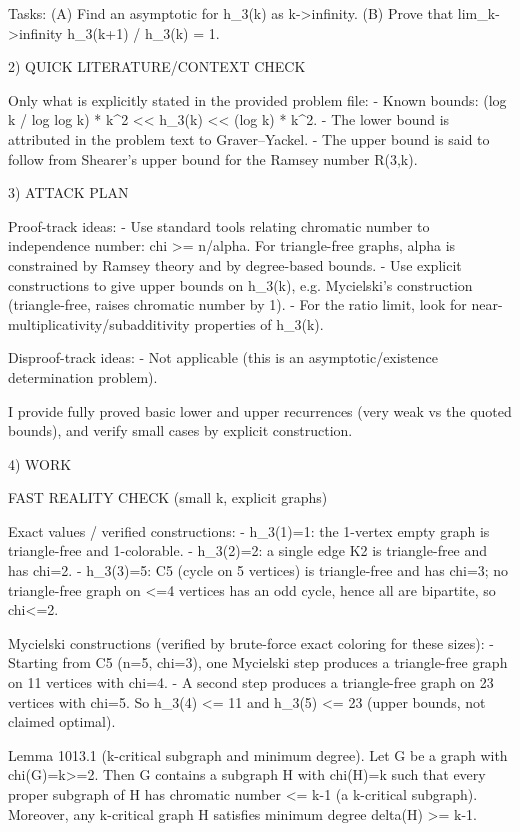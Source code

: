 Tasks:
(A) Find an asymptotic for h_3(k) as k->infinity.
(B) Prove that
  lim_{k->infinity} h_3(k+1) / h_3(k) = 1.

2) QUICK LITERATURE/CONTEXT CHECK

Only what is explicitly stated in the provided problem file:
- Known bounds:
    (log k / log log k) * k^2 << h_3(k) << (log k) * k^2.
- The lower bound is attributed in the problem text to Graver--Yackel.
- The upper bound is said to follow from Shearer's upper bound for the Ramsey number R(3,k).

3) ATTACK PLAN

Proof-track ideas:
- Use standard tools relating chromatic number to independence number: chi >= n/alpha.
  For triangle-free graphs, alpha is constrained by Ramsey theory and by degree-based bounds.
- Use explicit constructions to give upper bounds on h_3(k), e.g. Mycielski's construction (triangle-free, raises chromatic number by 1).
- For the ratio limit, look for near-multiplicativity/subadditivity properties of h_3(k).

Disproof-track ideas:
- Not applicable (this is an asymptotic/existence determination problem).

I provide fully proved basic lower and upper recurrences (very weak vs the quoted bounds), and verify small cases by explicit construction.

4) WORK

FAST REALITY CHECK (small k, explicit graphs)

Exact values / verified constructions:
- h_3(1)=1: the 1-vertex empty graph is triangle-free and 1-colorable.
- h_3(2)=2: a single edge K2 is triangle-free and has chi=2.
- h_3(3)=5: C5 (cycle on 5 vertices) is triangle-free and has chi=3; no triangle-free graph on <=4 vertices has an odd cycle, hence all are bipartite, so chi<=2.

Mycielski constructions (verified by brute-force exact coloring for these sizes):
- Starting from C5 (n=5, chi=3), one Mycielski step produces a triangle-free graph on 11 vertices with chi=4.
- A second step produces a triangle-free graph on 23 vertices with chi=5.
So h_3(4) <= 11 and h_3(5) <= 23 (upper bounds, not claimed optimal).

Lemma 1013.1 (k-critical subgraph and minimum degree).
Let G be a graph with chi(G)=k>=2.
Then G contains a subgraph H with chi(H)=k such that every proper subgraph of H has chromatic number <= k-1 (a k-critical subgraph).
Moreover, any k-critical graph H satisfies minimum degree delta(H) >= k-1.

